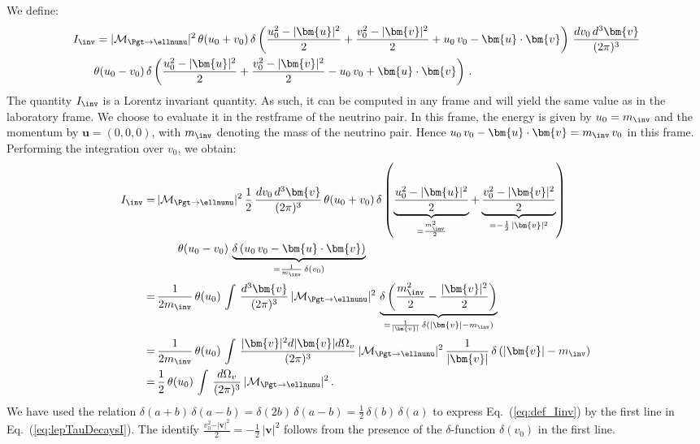 We define:
\begin{align}
& \, I_{\inv} = \vert\mathcal{M}_{\Pgt \to
  \ellnunu}\vert^{2} \, \theta(u_{0} + v_{0}) \, \delta
\left( \frac{u_{0}^{2} - \vert\bm{u}\vert^{2}}{2} + \frac{v_{0}^{2} - \vert\bm{v}\vert^{2}}{2} +
  u_{0} \, v_{0} - \bm{u} \cdot \bm{v} \right) \, 
  \frac{dv_{0} \, d^{3}\bm{v}}{(2\pi)^{3}} \nonumber \\
 & \qquad
  \theta(u_{0}
  - v_{0}) \, \delta \left( \frac{u_{0}^{2} - \vert\bm{u}\vert^{2}}{2} +
    \frac{v_{0}^{2} - \vert\bm{v}\vert^{2}}{2} - u_{0} \, v_{0} + \bm{u}
    \cdot \bm{v} \right) \, .
\label{eq:def_Iinv}
\end{align}
The quantity $I_{\inv}$ is a Lorentz invariant quantity. 
As such, it can be computed in any frame and will yield the same value as in the laboratory frame.
We choose to evaluate it in the restframe of the neutrino pair.
In this frame, the energy is given by $u_{0} = m_{\inv}$ 
and the momentum by $\bm{u} = ( 0, 0, 0 )$, with $m_{\inv}$ denoting
the mass of the neutrino pair.
Hence $u_{0} \, v_{0} - \bm{u} \cdot \bm{v} = m_{\inv} \, v_{0} $ in this frame.
Performing the integration over $v_{0}$, we obtain:
\begin{align}
I_{\inv}
= & \, \vert\mathcal{M}_{\Pgt \to
  \ellnunu}\vert^{2} \, \frac{1}{2} \, \frac{dv_{0} \, d^{3}\bm{v}}{(2\pi)^{3}} \, \theta ( u_{0} + v_{0} ) \, 
    \delta \left( \underbrace{\frac{u_{0}^{2} - \vert\bm{u}\vert^{2}}{2}}_{=
        \frac{m^{2}_{\inv}}{2}} + \underbrace{\frac{v_{0}^{2} -
        \vert\bm{v}\vert^{2}}{2}}_{= -\frac{1}{2} \, \vert\bm{v}\vert^{2}} \right)
    \nonumber \\
& \qquad
    \theta ( u_{0} - v_{0} ) \, \underbrace{\delta \left(
        u_{0} \, v_{0} - \bm{u} \cdot \bm{v} \right)}_{= \frac{1}{m_{\inv}} \, \delta ( v_{0} )} \nonumber \\
= & \, \frac{1}{2 m_{\inv}} \, \theta ( u_{0} ) \, \int \, \frac{d^{3}\bm{v}}{(2\pi)^{3}} \, 
  \vert\mathcal{M}_{\Pgt \to
  \ellnunu}\vert^{2} \, \underbrace{\delta \left( \frac{m^{2}_{\inv}}{2} - \frac{\vert\bm{v}\vert^{2}}{2} \right)}_{
    = \frac{1}{\vert\bm{v}\vert} \, \delta \left( \vert\bm{v}\vert - m_{\inv} \right)} \nonumber \\
= & \, \frac{1}{2 m_{\inv}} \, \theta ( u_{0} ) \, \int \, \frac{\vert\bm{v}\vert^2 d\vert\bm{v}\vert d\Omega_{v}}{(2\pi)^{3}} \, 
  \vert\mathcal{M}_{\Pgt \to
  \ellnunu}\vert^{2} \, \frac{1}{\vert\bm{v}\vert} \, \delta \left( \vert\bm{v}\vert - m_{\inv} \right) \nonumber \\
= & \, \frac{1}{2} \, \theta ( u_{0} ) \, \int \, \frac{d\Omega_{v}}{(2\pi)^{3}} \, \vert\mathcal{M}_{\Pgt \to
  \ellnunu}\vert^{2} \, . 
\label{eq:lepTauDecaysI}
\end{align}
We have used the relation $\delta(a + b) \, \delta(a - b) = \delta(2b) \, \delta(a - b) = \frac{1}{2} \, \delta(b) \, \delta(a)$ 
to express Eq.~(\ref{eq:def_Iinv}) by the first line in
Eq.~(\ref{eq:lepTauDecaysI}).
The identify $\frac{v_{0}^{2} - \vert\bm{v}\vert^{2}}{2} =
-\frac{1}{2} \, \vert\bm{v}\vert^{2}$ follows from the presence of the 
$\delta$-function $\delta ( v_{0} )$ in the first line.

